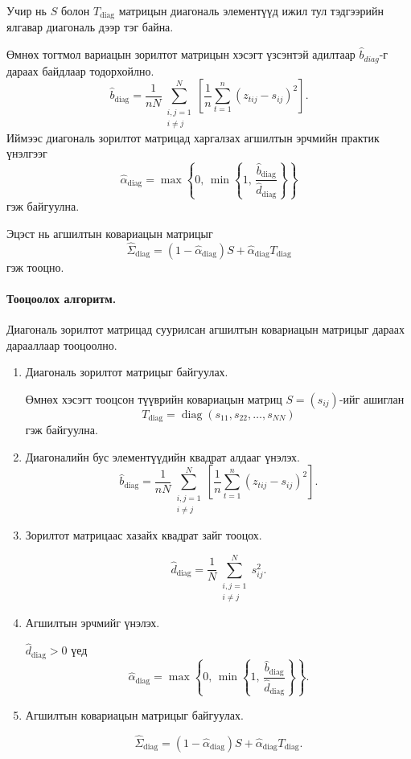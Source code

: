 Учир нь $S$ болон $T_{\mathrm{diag}}$
матрицын диагональ элементүүд ижил тул
тэдгээрийн ялгавар диагональ дээр тэг байна.

Өмнөх тогтмол вариацын зорилтот матрицын хэсэгт үзсэнтэй адилтаар $\widehat{b}_{diag}$-г дараах байдлаар тодорхойлно. 
\[
\widehat b_{\mathrm{diag}}
=
\frac{1}{nN}
\sum_{\substack{i,j=1\\i\neq j}}^{N}
\left[
\frac{1}{n}
\sum_{t=1}^{n}
(z_{tij}-s_{ij})^2
\right].
\]
Иймээс диагональ зорилтот матрицад
харгалзах агшилтын эрчмийн
практик үнэлгээг
\[
\widehat{\alpha}_{\mathrm{diag}}
=
\max\left\{
0,\,
\min\left\{
1,\,
\frac{\widehat b_{\mathrm{diag}}}
{\widehat d_{\mathrm{diag}}}
\right\}
\right\}
\]
гэж байгуулна.

Эцэст нь агшилтын ковариацын
матрицыг
\[
\widehat{\Sigma}_{\mathrm{diag}}
=
(1-\widehat{\alpha}_{\mathrm{diag}})S
+
\widehat{\alpha}_{\mathrm{diag}}
T_{\mathrm{diag}}
\]
гэж тооцно.

\paragraph{Тооцоолох алгоритм.}

Диагональ зорилтот матрицад суурилсан
агшилтын ковариацын матрицыг дараах
дарааллаар тооцоолно.

\begin{enumerate}
	\item Диагональ зорилтот матрицыг байгуулах.
	
	Өмнөх хэсэгт тооцсон түүврийн ковариацын
	матриц $S=(s_{ij})$-ийг ашиглан
	\[
	T_{\mathrm{diag}}
	=
	\operatorname{diag}
	(s_{11},s_{22},\ldots,s_{NN})
	\]
	гэж байгуулна.
	\item Диагоналийн бус элементүүдийн
	квадрат алдааг үнэлэх.
	\[
	\widehat b_{\mathrm{diag}}
	=
	\frac{1}{nN}
	\sum_{\substack{i,j=1\\i\neq j}}^{N}
	\left[
	\frac{1}{n}
	\sum_{t=1}^{n}
	(z_{tij}-s_{ij})^2
	\right].
	\]
	\item Зорилтот матрицаас хазайх
	квадрат зайг тооцох.
	
	\[
	\widehat d_{\mathrm{diag}}
	=
	\frac{1}{N}
	\sum_{\substack{i,j=1\\i\neq j}}^{N}
	s_{ij}^{2}.
	\]
	
	\item Агшилтын эрчмийг үнэлэх.
	
	$\widehat d_{\mathrm{diag}}>0$ үед
	\[
	\widehat{\alpha}_{\mathrm{diag}}
	=
	\max\left\{
	0,\,
	\min\left\{
	1,\,
	\frac{\widehat b_{\mathrm{diag}}}
	{\widehat d_{\mathrm{diag}}}
	\right\}
	\right\}.
	\]
	
	\item Агшилтын ковариацын
	матрицыг байгуулах.
	
	\[
	\widehat{\Sigma}_{\mathrm{diag}}
	=
	(1-\widehat{\alpha}_{\mathrm{diag}})S
	+
	\widehat{\alpha}_{\mathrm{diag}}
	T_{\mathrm{diag}}.
	\]
\end{enumerate}


